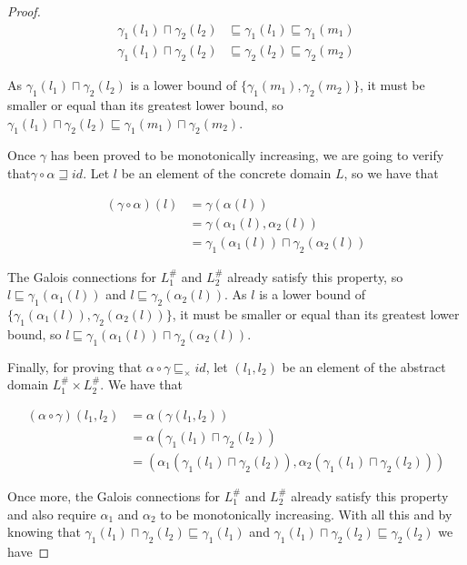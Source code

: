 \documentclass{article}
\begin{document}
\begin{proof}
  \begin{align*}
    \gamma_1(l_1) \sqcap \gamma_2(l_2) &\sqsubseteq \gamma_1(l_1) 
      \sqsubseteq \gamma_1(m_1) \\
    \gamma_1(l_1) \sqcap \gamma_2(l_2) &\sqsubseteq \gamma_2(l_2) 
      \sqsubseteq \gamma_2(m_2)
  \end{align*}

  As $\gamma_1(l_1) \sqcap \gamma_2(l_2)$ is a lower bound of 
  $\{\gamma_1(m_1), \gamma_2(m_2)\}$, it must be smaller or equal
  than its greatest lower bound, so 
  $\gamma_1(l_1) \sqcap \gamma_2(l_2) \sqsubseteq 
  \gamma_1(m_1) \sqcap \gamma_2(m_2)$.

  Once $\gamma$ has been proved to be monotonically increasing,
  we are going to verify that$\gamma \circ \alpha \sqsupseteq id$. 
  Let $l$ be an element of the concrete domain $L$, so we have that 

  \begin{align*}
    (\gamma \circ \alpha)(l) 
      &= \gamma(\alpha(l)) \\
      &= \gamma(\alpha_1(l), \alpha_2(l)) \\
      &= \gamma_1(\alpha_1(l)) \sqcap \gamma_2(\alpha_2(l))
  \end{align*}

  The Galois connections for 
  $L_1^\#$ and $L_2^\#$ already satisfy this property, so 
  $l \sqsubseteq \gamma_1(\alpha_1(l))$ and 
  $l \sqsubseteq \gamma_2(\alpha_2(l))$. As $l$ is a lower bound of 
  $\{\gamma_1(\alpha_1(l)), \gamma_2(\alpha_2(l))\}$, it must be
  smaller or equal than its greatest lower bound, so 
  $l \sqsubseteq \gamma_1(\alpha_1(l)) \sqcap \gamma_2(\alpha_2(l))$.

  Finally, for proving that $\alpha \circ \gamma 
  \sqsubseteq_\times id$, let $(l_1, l_2)$ be an element of 
  the abstract domain $L_1^\# \times L_2^\#$. We have that 

  \begin{align*}
    (\alpha \circ \gamma)(l_1, l_2)
      &= \alpha(\gamma(l_1, l_2)) \\
      &= \alpha(\gamma_1(l_1) \sqcap \gamma_2(l_2)) \\
      &= (\alpha_1(\gamma_1(l_1) \sqcap \gamma_2(l_2)), 
        \alpha_2(\gamma_1(l_1) \sqcap \gamma_2(l_2)))
  \end{align*}

  Once more, the Galois connections for $L_1^\#$ and $L_2^\#$ 
  already satisfy
  this property and also require $\alpha_1$ and $\alpha_2$ to be 
  monotonically increasing. With all this and by knowing that 
  $\gamma_1(l_1) \sqcap \gamma_2(l_2) \sqsubseteq \gamma_1(l_1)$ and 
  $\gamma_1(l_1) \sqcap \gamma_2(l_2) \sqsubseteq \gamma_2(l_2)$ 
  we have


\end{proof}
\end{document}
